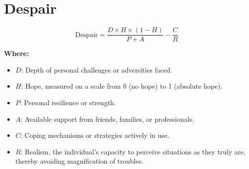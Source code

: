 \chapter{Despair}

\begin{equation}
\text{Despair} = \frac{D \times H \times (1 - H)}{P + A} - \frac{C}{R}
\end{equation}

\textbf{Where:}

\begin{itemize}
    \item $D$: Depth of personal challenges or adversities faced.
    \item $H$: Hope, measured on a scale from 0 (no hope) to 1 (absolute hope).
    \item $P$: Personal resilience or strength.
    \item $A$: Available support from friends, families, or professionals.
    \item $C$: Coping mechanisms or strategies actively in use.
    \item $R$: Realism, the individual's capacity to perceive situations as they truly are, thereby avoiding magnification of troubles.
\end{itemize}
